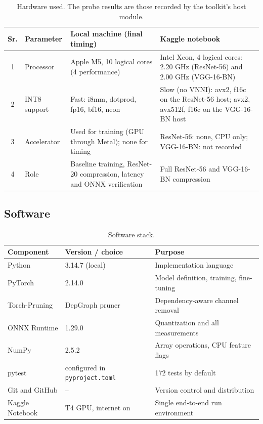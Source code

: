 \documentclass[oneside,a4paper,12pt]{report}
\newcommand{\code}[1]{\texttt{\small #1}}
\begin{document}
\begin{table}[!htbp]
\centering
\small
\begin{tabularx}{\textwidth}{@{}c l X X@{}}
\toprule
Sr. & Parameter & Local machine (final timing) & Kaggle notebook\\
\midrule
1 & Processor & Apple M5, 10 logical cores (4 performance) & Intel Xeon, 4 logical cores: 2.20 GHz (ResNet-56) and 2.00 GHz (VGG-16-BN)\\
2 & INT8 support & Fast: i8mm, dotprod, fp16, bf16, neon & Slow (no VNNI): avx2, f16c on the ResNet-56 host; avx2, avx512f, f16c on the VGG-16-BN host\\
3 & Accelerator & Used for training (GPU through Metal); none for timing & ResNet-56: none, CPU only; VGG-16-BN: not recorded\\
4 & Role & Baseline training, ResNet-20 compression, latency and ONNX verification & Full ResNet-56 and VGG-16-BN compression\\
\bottomrule
\end{tabularx}
\caption{Hardware used. The probe results are those recorded by the toolkit's host module.}
\label{tab:hw}
\end{table}

\subsection{Software}
\begin{table}[!htbp]
\centering
\small
\begin{tabular}{@{}l l p{6.5cm}@{}}
\toprule
Component & Version / choice & Purpose\\
\midrule
Python & 3.14.7 (local) & Implementation language\\
PyTorch & 2.14.0 & Model definition, training, fine-tuning\\
Torch-Pruning & DepGraph pruner & Dependency-aware channel removal\\
ONNX Runtime & 1.29.0 & Quantization and all measurements\\
NumPy & 2.5.2 & Array operations, CPU feature flags\\
pytest & configured in \code{pyproject.toml} & 172 tests by default\\
Git and GitHub & -- & Version control and distribution\\
Kaggle Notebook & T4 GPU, internet on & Single end-to-end run environment\\
\bottomrule
\end{tabular}
\caption{Software stack.}
\label{tab:sw}
\end{table}
\end{document}
